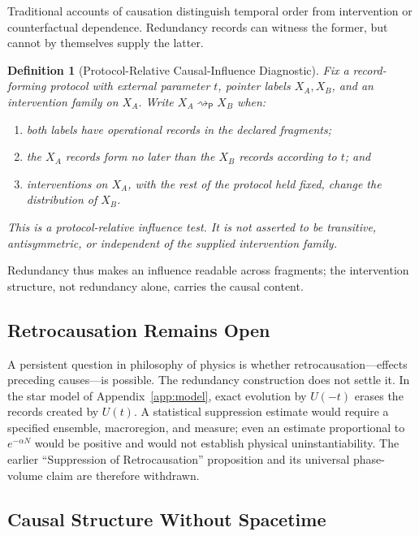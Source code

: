 \documentclass[12pt,a4paper]{article}
\newtheorem{definition}[theorem]{Definition}
\begin{document}
Traditional accounts of causation distinguish temporal order from intervention or counterfactual dependence.  Redundancy records can witness the former, but cannot by themselves supply the latter.

\begin{definition}[Protocol-Relative Causal-Influence Diagnostic]
\label{def:causal}
Fix a record-forming protocol with external parameter $t$, pointer labels $X_A,X_B$, and an intervention family on $X_A$.  Write $X_A\rightsquigarrow_{\mathsf P}X_B$ when:
\begin{enumerate}
    \item both labels have operational records in the declared fragments;
    \item the $X_A$ records form no later than the $X_B$ records according to $t$; and
    \item interventions on $X_A$, with the rest of the protocol held fixed, change the distribution of $X_B$.
\end{enumerate}
This is a protocol-relative influence test.  It is not asserted to be transitive, antisymmetric, or independent of the supplied intervention family.
\end{definition}

Redundancy thus makes an influence readable across fragments; the intervention structure, not redundancy alone, carries the causal content.

\subsection{Retrocausation Remains Open}

A persistent question in philosophy of physics is whether retrocausation---effects preceding causes---is possible.  The redundancy construction does not settle it.  In the star model of Appendix~\ref{app:model}, exact evolution by $U(-t)$ erases the records created by $U(t)$.  A statistical suppression estimate would require a specified ensemble, macroregion, and measure; even an estimate proportional to $e^{-\alpha N}$ would be positive and would not establish physical uninstantiability.  The earlier ``Suppression of Retrocausation'' proposition and its universal phase-volume claim are therefore withdrawn.

\subsection{Causal Structure Without Spacetime}
\end{document}
